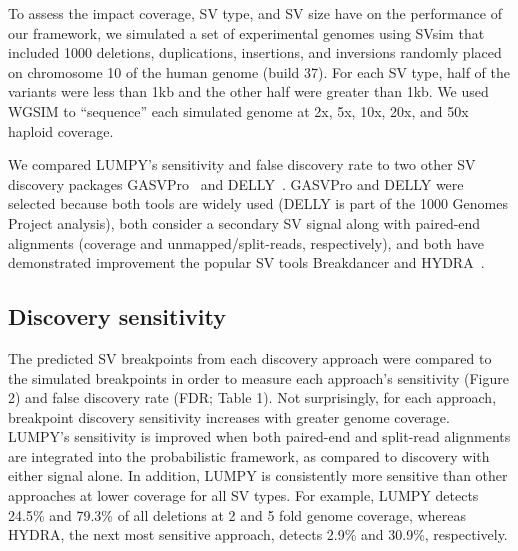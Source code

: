\documentclass[10pt]{bmc_article}
\newenvironment{bmcformat}{\begin{raggedright}\baselineskip20pt\sloppy\setboolean{publ}{false}}{\end{raggedright}\baselineskip20pt\sloppy}
\begin{document}
\begin{bmcformat}
To assess the impact coverage, SV type, and SV size have on the performance of
our framework, we simulated a set of experimental genomes using SVsim that
included 1000 deletions, duplications, insertions, and inversions randomly
placed on chromosome 10 of the human genome (build 37).  For each SV type, half
of the variants were less than 1kb and the other half were greater than 1kb.  We
used WGSIM to “sequence” each simulated genome at 2x, 5x, 10x, 20x, and 50x
haploid coverage.

We compared LUMPY’s sensitivity and false discovery rate to two other SV
discovery packages GASVPro~\cite{sindi2012} and DELLY~\cite{rausch2012b}.
GASVPro and DELLY were selected because both tools are widely used (DELLY is
part of the 1000 Genomes Project analysis), both consider a secondary SV signal
along with paired-end alignments (coverage and unmapped/split-reads,
respectively), and both have demonstrated improvement the popular SV tools
Breakdancer and HYDRA~\cite{quinlan2010b}. 



\subsection*{Discovery sensitivity}
The predicted SV breakpoints from each discovery approach were compared to the
simulated breakpoints in order to measure each approach's sensitivity (Figure 2)
and false discovery rate (FDR; Table 1). Not surprisingly, for each approach,
breakpoint discovery sensitivity increases with greater genome coverage.
LUMPY's sensitivity is improved when both paired-end and split-read
alignments are integrated into the probabilistic framework, as compared to
discovery with either signal alone. In addition, LUMPY is consistently more
sensitive than other approaches at lower coverage for all SV types. For example,
LUMPY detects 24.5\% and 79.3\% of all deletions at 2 and 5 fold genome
coverage, whereas HYDRA, the next most sensitive approach, detects 2.9\% and
30.9\%, respectively.


\end{bmcformat}
\end{document}
